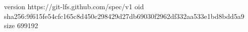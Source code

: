 version https://git-lfs.github.com/spec/v1
oid sha256:9f615fe54cfc165c8d450c298429d27db69030f2962df332aa533e1bd8bdd5a9
size 699192
